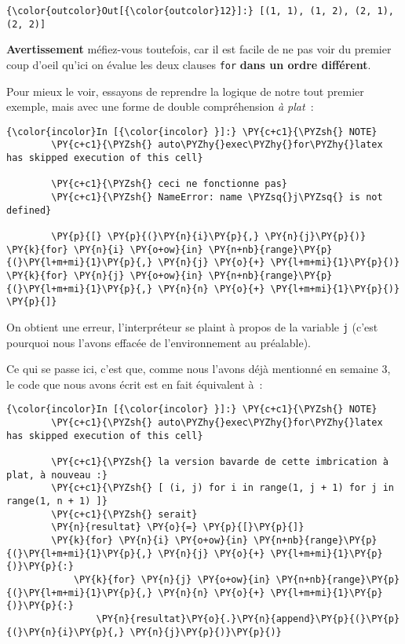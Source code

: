 \begin{Verbatim}[commandchars=\\\{\},frame=single,framerule=0.3mm,rulecolor=\color{cellframecolor}]
{\color{outcolor}Out[{\color{outcolor}12}]:} [(1, 1), (1, 2), (2, 1), (2, 2)]
\end{Verbatim}
            
    \textbf{Avertissement} méfiez-vous toutefois, car il est facile de ne
pas voir du premier coup d'oeil qu'ici on évalue les deux clauses
\texttt{for} \textbf{dans un ordre différent}.

    Pour mieux le voir, essayons de reprendre la logique de notre tout
premier exemple, mais avec une forme de double compréhension \emph{à
plat}~:

    \begin{Verbatim}[commandchars=\\\{\},frame=single,framerule=0.3mm,rulecolor=\color{cellframecolor}]
{\color{incolor}In [{\color{incolor} }]:} \PY{c+c1}{\PYZsh{} NOTE}
        \PY{c+c1}{\PYZsh{} auto\PYZhy{}exec\PYZhy{}for\PYZhy{}latex has skipped execution of this cell}
        
        \PY{c+c1}{\PYZsh{} ceci ne fonctionne pas}
        \PY{c+c1}{\PYZsh{} NameError: name \PYZsq{}j\PYZsq{} is not defined}
        
        \PY{p}{[} \PY{p}{(}\PY{n}{i}\PY{p}{,} \PY{n}{j}\PY{p}{)} \PY{k}{for} \PY{n}{i} \PY{o+ow}{in} \PY{n+nb}{range}\PY{p}{(}\PY{l+m+mi}{1}\PY{p}{,} \PY{n}{j} \PY{o}{+} \PY{l+m+mi}{1}\PY{p}{)} \PY{k}{for} \PY{n}{j} \PY{o+ow}{in} \PY{n+nb}{range}\PY{p}{(}\PY{l+m+mi}{1}\PY{p}{,} \PY{n}{n} \PY{o}{+} \PY{l+m+mi}{1}\PY{p}{)} \PY{p}{]}
\end{Verbatim}


    On obtient une erreur, l'interpréteur se plaint à propos de la variable
\texttt{j} (c'est pourquoi nous l'avons effacée de l'environnement au
préalable).

    Ce qui se passe ici, c'est que, comme nous l'avons déjà mentionné en
semaine 3, le code que nous avons écrit est en fait équivalent à~:

    \begin{Verbatim}[commandchars=\\\{\},frame=single,framerule=0.3mm,rulecolor=\color{cellframecolor}]
{\color{incolor}In [{\color{incolor} }]:} \PY{c+c1}{\PYZsh{} NOTE}
        \PY{c+c1}{\PYZsh{} auto\PYZhy{}exec\PYZhy{}for\PYZhy{}latex has skipped execution of this cell}
        
        \PY{c+c1}{\PYZsh{} la version bavarde de cette imbrication à plat, à nouveau :}
        \PY{c+c1}{\PYZsh{} [ (i, j) for i in range(1, j + 1) for j in range(1, n + 1) ]}
        \PY{c+c1}{\PYZsh{} serait}
        \PY{n}{resultat} \PY{o}{=} \PY{p}{[}\PY{p}{]}
        \PY{k}{for} \PY{n}{i} \PY{o+ow}{in} \PY{n+nb}{range}\PY{p}{(}\PY{l+m+mi}{1}\PY{p}{,} \PY{n}{j} \PY{o}{+} \PY{l+m+mi}{1}\PY{p}{)}\PY{p}{:}
            \PY{k}{for} \PY{n}{j} \PY{o+ow}{in} \PY{n+nb}{range}\PY{p}{(}\PY{l+m+mi}{1}\PY{p}{,} \PY{n}{n} \PY{o}{+} \PY{l+m+mi}{1}\PY{p}{)}\PY{p}{:}
                \PY{n}{resultat}\PY{o}{.}\PY{n}{append}\PY{p}{(}\PY{p}{(}\PY{n}{i}\PY{p}{,} \PY{n}{j}\PY{p}{)}\PY{p}{)}
\end{Verbatim}


